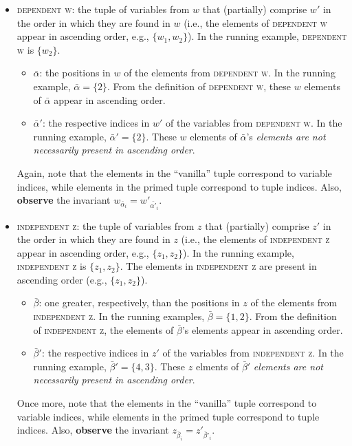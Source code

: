 \documentclass{article}
\newcommand{\1}{(\textos{1})\!}
\newcommand{\2}{(\textos{2})\!}
\newcommand{\3}{(\textos{3})\!}
\newcommand{\4}{(\textos{4})\!}
\newcommand{\5}{(\textos{5})\!}
\newcommand{\6}{(\textos{6})\!}
\newcommand{\7}{(\textos{7})\!}
\newcommand{\8}{(\textos{8})\!}
\begin{document}
\begin{itemize}
	\item \textsc{dependent w}: the tuple of variables from $w$ that (partially) comprise $w'$ in the order in which they are found in $w$ (i.e., the elements of \textsc{dependent w} appear in ascending order, e.g., $\{ w_1, w_2 \}$). In the running example, \textsc{dependent w} is $\{ w_2 \}$.
		\begin{itemize}
			\item $\bar{\alpha}$: the positions in $w$ of the elements from \textsc{dependent w}. In the running example, $\bar{\alpha} = \{ 2 \}$. From the definition of \textsc{dependent w}, these $w$ elements of $\bar{\alpha}$ appear in ascending order.
			\item $\bar{\alpha}'$: the respective indices in $w'$ of the variables from \textsc{dependent w}. In the running example, $\bar{\alpha}' = \{ 2 \}$. These $w$ elements of $\bar{\alpha}$'s \emph{elements are not necessarily present in ascending order}.
		\end{itemize}
		Again, note that the elements in the ``vanilla'' tuple correspond to variable indices, while elements in the primed tuple correspond to tuple indices. Also, \textbf{observe} the invariant $w_{\bar{\alpha}_i} = w'_{\bar{\alpha'}_i}$.
	\item \textsc{independent z}: the tuple of variables from $z$ that (partially) comprise $z'$ in the order in which they are found in $z$ (i.e., the elements of \textsc{independent z} appear in ascending order, e.g., $\{ z_1, z_2 \}$). In the running example, \textsc{independent z} is $\{ z_1, z_2 \}$. The elements in \textsc{independent z} are present in ascending order (e.g., $\{ z_1, z_2 \}$).
		\begin{itemize}
			\item $\bar{\beta}$: one greater, respectively, than the positions in $z$ of the elements from \textsc{independent z}. In the running examples, $\bar{\beta} = \{1, 2 \}$. From the definition of \textsc{independent z}, the elements of $\bar{\beta}$'s elements appear in ascending order.
			\item $\bar{\beta}'$: the respective indices in $z'$ of the variables from \textsc{independent z}. In the running example, $\bar{\beta}' = \{4, 3 \}$. These $z$ elments of $\bar{\beta}'$ \emph{elements are not necessarily present in ascending order}.
		\end{itemize}
		Once more, note that the elements in the ``vanilla'' tuple correspond to variable indices, while elements in the primed tuple correspond to tuple indices. Also, \textbf{observe} the invariant $z_{\bar{\beta}_i} = z'_{\bar{\beta}'_i}$.
\end{itemize}
\end{document}
